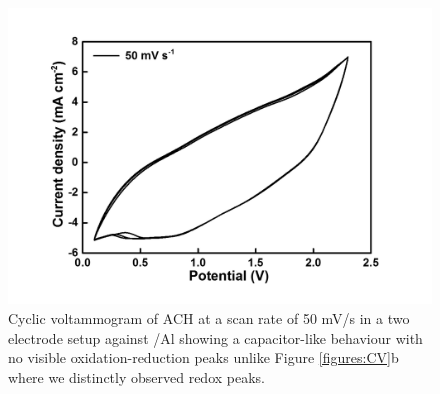 \begin{figure}[tbh!]
  \centering
  \includegraphics[width=\textwidth]{Figures/chap5fig/hair50mVs}
    \caption{Cyclic voltammogram of ACH at a scan rate of 50 mV/s in a two electrode setup against /Al showing a capacitor-like behaviour with no visible oxidation-reduction peaks unlike Figure \ref{figures:CV}b where we distinctly observed redox peaks.}
  \label{Figures/chap5fig:hair50mVs}
\end{figure}


